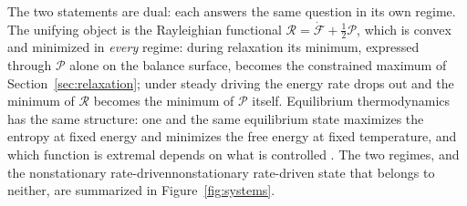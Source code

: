 \documentclass[12pt]{article}
\newif\ifhighlight \highlightfalse
\newif\ifhighlightfirst \highlightfirstfalse
\DeclareRobustCommand{\chg}[1]{\ifhighlight\ifhighlightfirst\textcolor{revised}{#1}\else#1\fi\else#1\fi}
\begin{document}
The two statements are dual: each answers the same question in its own regime. The unifying object is the Rayleighian functional $\mathcal{R} = \dot{\mathcal{F}} + \tfrac{1}{2}\mathcal{P}$, which is convex and minimized in \textit{every} regime: during relaxation its minimum, expressed through $\mathcal{P}$ alone on the balance surface, becomes the constrained maximum of Section~\ref{sec:relaxation}; under steady driving the energy rate drops out and the minimum of $\mathcal{R}$ becomes the minimum of $\mathcal{P}$ itself. Equilibrium thermodynamics has the same structure: one and the same equilibrium state maximizes the entropy at fixed energy and minimizes the free energy at fixed temperature, and which function is extremal depends on what is controlled \cite{kondepudi2014modern}. The two regimes, and the \chg{nonstationary rate-driven} state that belongs to neither, are summarized in Figure~\ref{fig:systems}.
\end{document}
